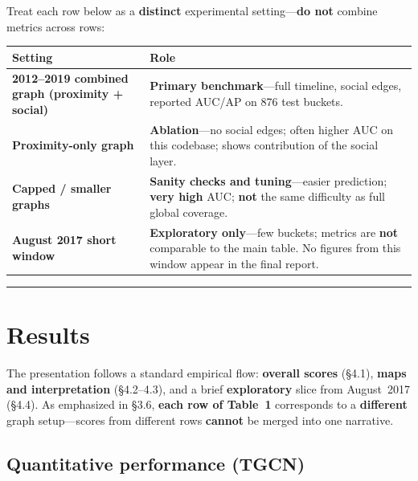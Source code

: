 \documentclass[
]{article}
\newcounter{none} %
\begin{document}
Treat each row below as a \textbf{distinct} experimental
setting---\textbf{do not} combine metrics across rows:

{\def\LTcaptype{none} %
\begin{longtable}[]{@{}
  >{\raggedright\arraybackslash}p{}
  >{\raggedright\arraybackslash}p{}@{}}
\toprule\noalign{}
\begin{minipage}[b]{\linewidth}\raggedright
Setting
\end{minipage} & \begin{minipage}[b]{\linewidth}\raggedright
Role
\end{minipage} \\
\midrule\noalign{}
\endhead
\bottomrule\noalign{}
\endlastfoot
\textbf{2012--2019 combined graph (proximity + social)} &
\textbf{Primary benchmark}---full timeline, social edges, reported
AUC/AP on 876 test buckets. \\
\textbf{Proximity-only graph} & \textbf{Ablation}---no social edges;
often higher AUC on this codebase; shows contribution of the social
layer. \\
\textbf{Capped / smaller graphs} & \textbf{Sanity checks and
tuning}---easier prediction; \textbf{very high} AUC; \textbf{not} the
same difficulty as full global coverage. \\
\textbf{August 2017 short window} & \textbf{Exploratory only}---few
buckets; metrics are \textbf{not} comparable to the main table. No
figures from this window appear in the final report. \\
\end{longtable}
}

\begin{center}\rule{0.5\linewidth}{0.5pt}\end{center}

\section{Results}\label{results}

The presentation follows a standard empirical flow: \textbf{overall
scores} (§4.1), \textbf{maps and interpretation} (§4.2--4.3), and a
brief \textbf{exploratory} slice from August~2017 (§4.4). As emphasized
in §3.6, \textbf{each row of Table~1} corresponds to a
\textbf{different} graph setup---scores from different rows
\textbf{cannot} be merged into one narrative.

\subsection{Quantitative performance
(TGCN)}\label{quantitative-performance-tgcn}
\end{document}

